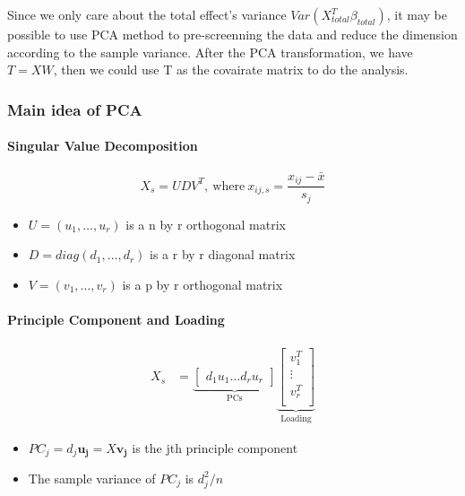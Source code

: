 \documentclass[]{article}
\providecommand{\tightlist}{%
  \setlength{\itemsep}{0pt}\setlength{\parskip}{0pt}}
\let\oldparagraph\paragraph
\renewcommand{\paragraph}[1]{\oldparagraph{#1}\mbox{}}
\begin{document}
Since we only care about the total effect's variance
\(Var(X_{total}^T\beta_{total})\), it may be possible to use PCA method
to pre-screenning the data and reduce the dimension according to the
sample variance. After the PCA transformation, we have \(T = XW\), then
we could use T as the covairate matrix to do the analysis.

\subsubsection{Main idea of PCA}\label{main-idea-of-pca}

\paragraph{Singular Value
Decomposition}\label{singular-value-decomposition}

\[
  X_s = UDV^T, ~\text{where} ~x_{ij,s} = \frac{x_{ij} - \bar{x}}{s_j}
\]

\begin{itemize}
\tightlist
\item
  \(U = (u_1, \dots, u_r)\) is a n by r orthogonal matrix\\
\item
  \(D = diag(d_1, \dots, d_r)\) is a r by r diagonal matrix\\
\item
  \(V = (v_1, \dots, v_r)\) is a p by r orthogonal matrix
\end{itemize}

\paragraph{Principle Component and
Loading}\label{principle-component-and-loading}

\begin{align*} 
  X_s &= \underbrace{\begin{bmatrix} d_1u_1 \hdots  d_ru_r \end{bmatrix} }_\text{PCs}
         \underbrace{\begin{bmatrix} v_1^T \\
                         \vdots \\
                         v_r^T \\
         \end{bmatrix}}_\text{Loading}
\end{align*}

\begin{itemize}
\tightlist
\item
  \(PC_j = d_j\pmb{u_j} = X\pmb{v_j}\) is the jth principle component
\item
  The sample variance of \(PC_j\) is \(d_j^2/n\)
\end{itemize}
\end{document}
